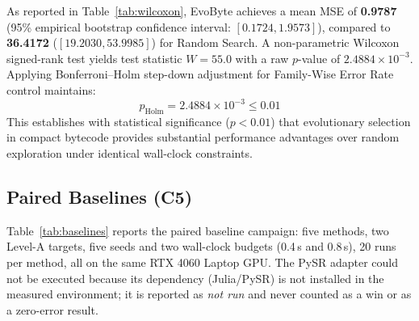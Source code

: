 \documentclass[11pt,a4paper]{article}
\begin{document}


As reported in Table~\ref{tab:wilcoxon}, EvoByte achieves a mean MSE of \textbf{0.9787} (95\% empirical bootstrap confidence interval: $[0.1724, 1.9573]$), compared to \textbf{36.4172} ($[19.2030, 53.9985]$) for Random Search. A non-parametric Wilcoxon signed-rank test yields test statistic $W = 55.0$ with a raw $p$-value of $2.4884 \times 10^{-3}$. Applying Bonferroni--Holm step-down adjustment for Family-Wise Error Rate control maintains:
\begin{equation}
    p_{\text{Holm}} = 2.4884 \times 10^{-3} \le 0.01
\end{equation}
This establishes with statistical significance ($p < 0.01$) that evolutionary selection in compact bytecode provides substantial performance advantages over random exploration under identical wall-clock constraints.

\subsection{Paired Baselines (C5)}
\label{sec:baselines}
Table~\ref{tab:baselines} reports the paired baseline campaign: five methods, two Level-A
targets, five seeds and two wall-clock budgets (0.4\,s and 0.8\,s), 20 runs per method, all on
the same RTX 4060 Laptop GPU. The PySR adapter could not be executed because its dependency
(Julia/PySR) is not installed in the measured environment; it is reported as \emph{not run} and
never counted as a win or as a zero-error result.

\begin{table}[t]
\centering
\caption{Measured paired baseline campaign (P155). 20 runs per method on two Level-A targets,
five seeds, budgets 0.4\,s and 0.8\,s. The PySR adapter was not executed.}
\label{tab:baselines}
\end{table}
\end{document}

